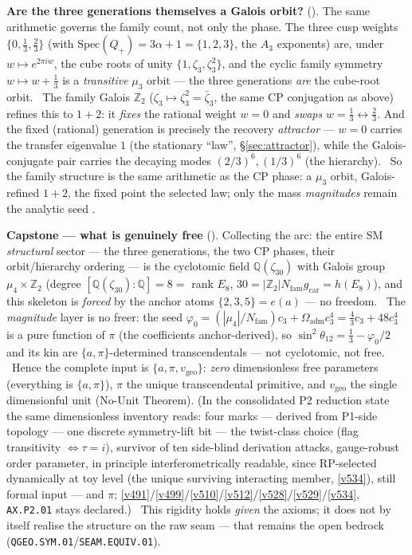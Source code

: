 \documentclass[11pt,a4paper]{article}
\newcommand{\cthree}{c_3}
\newcommand{\phiz}{\varphi_0}
\newcommand{\gcar}{g_{\mathrm{car}}}
\newcommand{\Nfam}{N_{\mathrm{fam}}}
\newcommand{\Z}{\mathbb Z}
\begin{document}
\par\smallskip\noindent\textbf{Are the three generations themselves a Galois orbit?}
(). The same arithmetic governs the family count, not only the phase. The three cusp
weights $\{0,\tfrac13,\tfrac23\}$ (with $\mathrm{Spec}(Q_+)=3\alpha+1=\{1,2,3\}$, the $A_3$ exponents) are, under
$w\mapsto e^{2\pi i w}$, the cube roots of unity $\{1,\zeta_3,\zeta_3^2\}$, and the cyclic family symmetry
$w\mapsto w+\tfrac13$ is a \emph{transitive} $\mu_3$ orbit --- the three generations \emph{are} the cube-root orbit.
\mE\ The family Galois $\Z_2$ ($\zeta_3\mapsto\zeta_3^2=\bar\zeta_3$, the same CP conjugation as above) refines this
to $1{+}2$: it \emph{fixes} the rational weight $w=0$ and \emph{swaps} $w=\tfrac13\leftrightarrow\tfrac23$. And the
fixed (rational) generation is precisely the recovery \emph{attractor} --- $w=0$ carries the transfer eigenvalue $1$
(the stationary ``law'', \S\ref{sec:attractor}), while the Galois-conjugate pair carries the decaying modes
$(2/3)^6,(1/3)^6$ (the hierarchy). \mE\ So the family structure is the same arithmetic as the CP phase: a $\mu_3$
orbit, Galois-refined $1{+}2$, the fixed point the selected law; only the mass \emph{magnitudes} remain the analytic
seed \mC.

\par\smallskip\noindent\textbf{Capstone --- what is genuinely free} ().
Collecting the arc: the entire SM \emph{structural} sector --- the three generations, the two CP phases, their
orbit/hierarchy ordering --- is the cyclotomic field $\mathbb Q(\zeta_{30})$ with Galois group $\mu_4\times\Z_2$
(degree $[\mathbb Q(\zeta_{30}){:}\mathbb Q]=8=$ rank $E_8$, $30=|\Z_2|\Nfam\gcar=h(E_8)$), and this skeleton is
\emph{forced} by the anchor atoms $\{2,3,5\}=e(a)$ --- no freedom. \mE\ The \emph{magnitude} layer is no freer: the
seed $\phiz=(|\mu_4|/\Nfam)\cthree+\Omega_{\mathrm{adm}}\cthree^4=\tfrac43\cthree+48\cthree^4$ is a pure function of
$\pi$ (the coefficients anchor-derived), so $\sin^2\theta_{12}=\tfrac13-\phiz/2$ and its kin are
$\{a,\pi\}$-determined transcendentals --- not cyclotomic, not free. \mE\ Hence the complete input is
$\{a,\pi,v_{\mathrm{geo}}\}$: \emph{zero} dimensionless free parameters (everything is $\{a,\pi\}$), $\pi$ the unique
transcendental primitive, and $v_{\mathrm{geo}}$ the single dimensionful unit (No-Unit Theorem). (In the
consolidated P2 reduction state the same dimensionless inventory reads: four marks --- derived from
P1-side topology --- one discrete symmetry-lift bit --- the twist-class choice (flag transitivity
$\iff\tau=i$), survivor of ten side-blind derivation attacks, gauge-robust order parameter, in
principle interferometrically readable, since RP-selected dynamically at toy level (the unique
surviving interacting member, \vref{v534}), still formal input --- and $\pi$;
\vref{v491}/\vref{v499}/\vref{v510}/\vref{v512}/\vref{v528}/\vref{v529}/\vref{v534},
\texttt{AX.P2.01} stays declared.) \mO\ This rigidity
holds \emph{given} the axioms; it does not by itself realise the structure on the raw seam --- that remains the open
bedrock (\texttt{QGEO.SYM.01}/\texttt{SEAM.EQUIV.01}).
\end{document}
